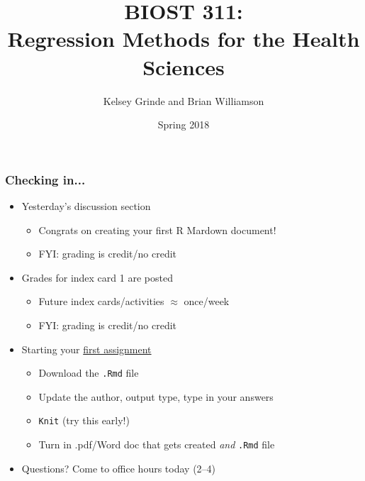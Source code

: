 \documentclass[12pt, 
hyperref={colorlinks=true, linkcolor=blue, urlcolor=cyan}]{beamer}
\title{BIOST 311: \\ Regression Methods for the Health Sciences}
\author{Kelsey Grinde and Brian Williamson}
\institute{UW Biostatistics}
\date{Spring 2018}
\begin{document}
\begin{frame}
\titlepage\thispagestyle{empty}
\end{frame}

\begin{frame}
\frametitle{Checking in...}
\begin{itemize}
\item Yesterday's discussion section %
	\begin{itemize}
	\item Congrats on creating your first R Mardown document!
	\item FYI: grading is credit/no credit
	\end{itemize}
\item Grades for index card 1 are posted %
	\begin{itemize}
	\item Future index cards/activities $\approx$ once/week
	\item FYI: grading is credit/no credit
	\end{itemize}
\item Starting your \href{https://canvas.uw.edu/courses/1203588/assignments/4098142}{first assignment} %
	\begin{itemize}
	\item Download the \texttt{.Rmd} file
	\item Update the author, output type, type in your answers %
	\item \texttt{Knit} (try this early!)
	\item Turn in .pdf/Word doc that gets created \textit{and} \texttt{.Rmd} file
	\end{itemize}
\item Questions? Come to office hours today (2--4) %
\end{itemize}
\end{frame}
\end{document}
